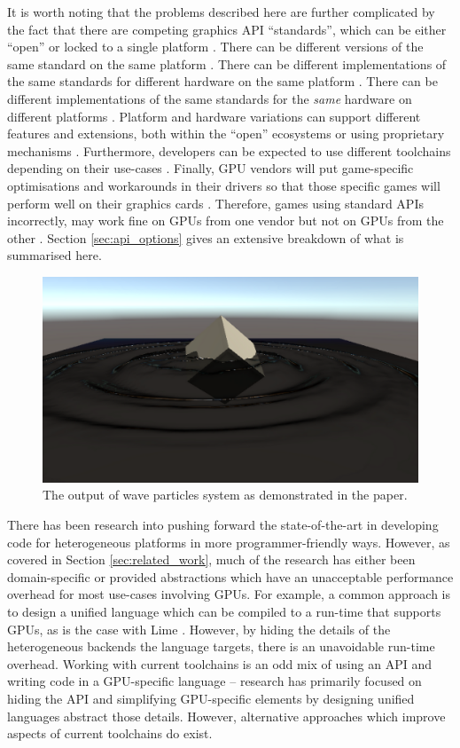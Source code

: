 \documentclass[a4paper,12pt,twoside,openright]{report}
\begin{document}
It is worth noting that the problems described here are further complicated by
the fact that there are competing graphics API ``standards'', which can be
either ``open'' \cite{OpenGL} \cite{Vulkan} or locked to a single platform
\cite{Direct3D} \cite{Metal}. There can be different versions of the same
standard on the same platform \cite{OpenGLHistory}. There can be different
implementations of the same standards for different hardware on the same
platform \cite{NVIDIADrivers} \cite{NVIDIADrivers}. There can be different
implementations of the same standards for the \textit{same} hardware on
different platforms \cite{OpenGLGettingStarted}. Platform and hardware
variations can support different features and extensions, both within the
``open'' ecosystems \cite{VulkanExtensions} or using proprietary mechanisms
\cite{PhysXSDK} \cite{HairworksAMD}. Furthermore, developers can be expected to
use different toolchains depending on their use-cases
\cite{KhronosDeveloperOverview}. Finally, GPU vendors will put game-specific
optimisations and workarounds in their drivers so that those specific games
will perform well on their graphics cards \cite{WhyGamesAreWorseOnLinux}.
Therefore, games using standard APIs incorrectly, may work fine on GPUs from
one vendor but not on GPUs from the other \cite{TODO}. Section
\ref{sec:api_options} gives an extensive breakdown of what is summarised here.

\begin{figure}[h]
\centering
\includegraphics[width=0.8\linewidth]{waveparticles_example}
\caption{The output of wave particles system as demonstrated in the paper.}
\label{fig:waveparticles_example}
\end{figure}

There has been research into pushing forward the state-of-the-art in developing
code for heterogeneous platforms in more programmer-friendly ways. However, as
covered in Section \ref{sec:related_work}, much of the research has either been
domain-specific or provided abstractions which have an unacceptable performance
overhead for most use-cases involving GPUs. For example, a common approach is
to design a unified language which can be compiled to a run-time that supports
GPUs, as is the case with Lime \cite{Lime2010}. However, by hiding the details
of the heterogeneous backends the language targets, there is an unavoidable
run-time overhead. Working with current toolchains is an odd mix of using an
API and writing code in a GPU-specific language -- research has primarily
focused on hiding the API and simplifying GPU-specific elements by designing
unified languages abstract those details. However, alternative approaches which
improve aspects of current toolchains do exist.
\end{document}
